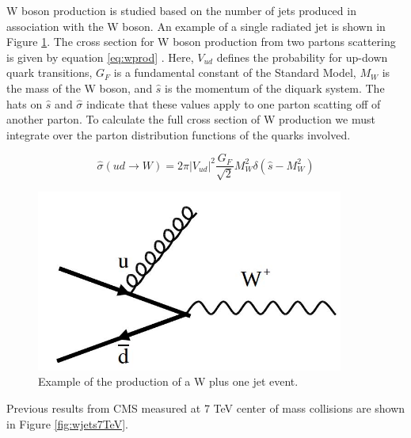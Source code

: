 \documentclass[oneside, letterpaper, oldfontcommands]{memoir}
\begin{document}
\qquad W boson production is studied based on the number of jets produced in association with the W boson. An example of a single radiated jet is shown in Figure \ref{fig:WOneJet}. The cross section for W boson production from two partons scattering is given by equation \ref{eq:wprod} \cite{Barger:0201058766}. Here, $V_{ud}$ defines the probability for up-down quark transitions, $G_{F}$ is a fundamental constant of the Standard Model, $M_{W}$ is the mass of the W boson, and $\hat{s}$ is the momentum of the diquark system. The hats on $\hat{s}$ and $\hat{\sigma}$ indicate that these values apply to one parton scatting off of another parton. To calculate the full cross section of W production we must integrate over the parton distribution functions of the quarks involved.

\begin{equation} \label{eq:wprod}
\hat{\sigma}(u d \rightarrow W) = 2\pi |V_{ud}|^{2}\frac{G_{F}}{\sqrt{2}}M_{W}^{2}\delta(\hat{s} - M_{W}^{2})
\end{equation}

\begin{figure}[here]
\includegraphics[width=0.9\textwidth]{WOneJet.jpg}
\caption{Example of the production of a W plus one jet event.}
\label{fig:WOneJet}
\end{figure}

Previous results from CMS measured at 7 TeV center of mass collisions\cite{Khachatryan:2014uva} are shown in Figure \ref{fig:wjets7TeV}. 
\end{document}
